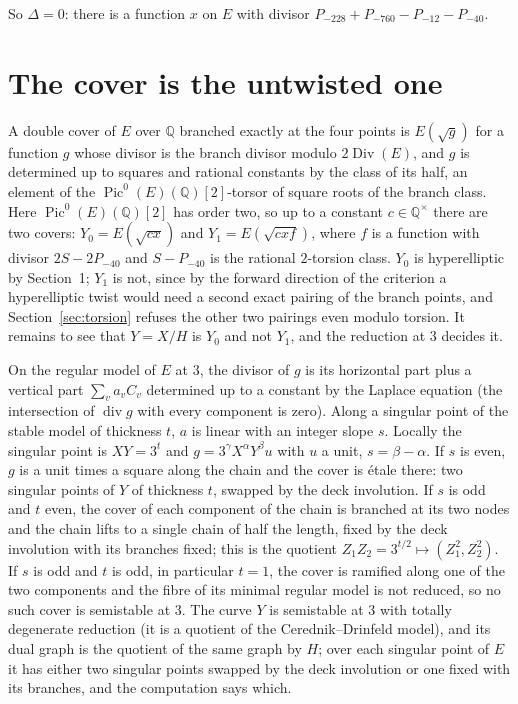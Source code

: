 \documentclass[11pt,reqno]{amsart}
\theoremstyle{plain}
\theoremstyle{definition}
\DeclareMathOperator{\Pic}{Pic}
\DeclareMathOperator{\Div}{Div}
\newcommand{\Q}{\mathbb{Q}}
\begin{document}
So $\Delta=0$: there is a function $x$ on $E$ with divisor $P_{-228}+P_{-760}-P_{-12}-P_{-40}$.

\section{The cover is the untwisted one}\label{sec:twist}

A double cover of $E$ over $\Q$ branched exactly at the four points is $E(\sqrt{g})$ for a function $g$
whose divisor is the branch divisor modulo $2\Div(E)$, and $g$ is determined up to squares and rational
constants by the class of its half, an element of the $\Pic^0(E)(\Q)[2]$-torsor of square roots of the
branch class. Here $\Pic^0(E)(\Q)[2]$ has order two, so up to a constant $c\in\Q^\times$ there are two
covers: $Y_0=E(\sqrt{cx})$ and $Y_1=E(\sqrt{cxf})$, where $f$ is a function with divisor $2S-2P_{-40}$
and $S-P_{-40}$ is the rational $2$-torsion class. $Y_0$ is hyperelliptic by Section~1; $Y_1$ is not,
since by the forward direction of the criterion a hyperelliptic twist would need a second exact
pairing of the branch points, and Section~\ref{sec:torsion} refuses the other two pairings even modulo
torsion. It remains to see that $Y=X/H$ is $Y_0$ and not $Y_1$, and the reduction at $3$ decides it.

On the regular model of $E$ at $3$, the divisor of $g$ is its horizontal part plus a vertical part
$\sum_v a_v C_v$ determined up to a constant by the Laplace equation (the intersection of $\operatorname{div}g$
with every component is zero). Along a singular point of the stable model of thickness $t$, $a$ is
linear with an integer slope $s$. Locally the singular point is $XY=3^t$ and $g=3^\gamma X^\alpha Y^\beta u$
with $u$ a unit, $s=\beta-\alpha$. If $s$ is even, $g$ is a unit times a square along the chain and the
cover is \'etale there: two singular points of $Y$ of thickness $t$, swapped by the deck involution.
If $s$ is odd and $t$ even, the cover of each component of the chain is branched at its two nodes
and the chain lifts to a single chain of half the length, fixed by the deck involution with its
branches fixed; this is the quotient $Z_1Z_2=3^{t/2}\mapsto(Z_1^2,Z_2^2)$. If $s$ is odd and $t$ is odd,
in particular $t=1$, the cover is ramified along one of the two components and the fibre of its
minimal regular model is not reduced, so no such cover is semistable at $3$. The curve $Y$ is
semistable at $3$ with totally degenerate reduction (it is a quotient of the Cerednik--Drinfeld model),
and its dual graph is the quotient of the same graph by $H$; over each singular point of $E$ it has
either two singular points swapped by the deck involution or one fixed with its branches, and the
computation says which.
\end{document}
